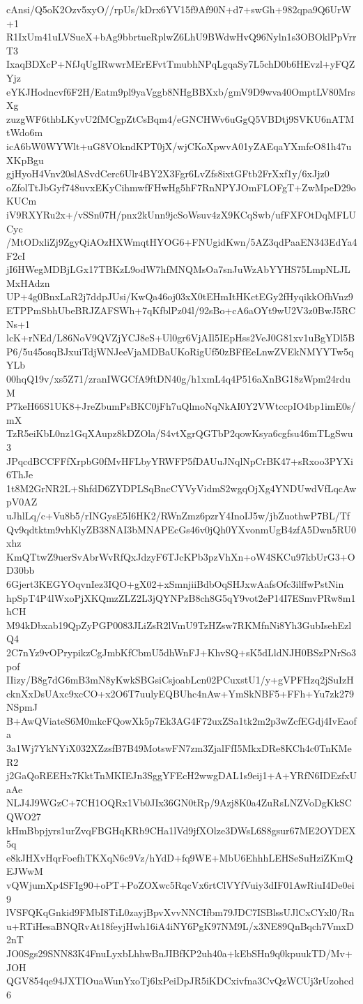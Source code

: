 cAnsi/Q5oK2Ozv5xyO//rpUs/kDrx6YV15f9Af90N+d7+swGh+982qpa9Q6UrW+1
R1IxUm41uLVSueX+bAg9bbrtueRplwZ6LhU9BWdwHvQ96Nyln1s3OBOklPpVrrT3
IxaqBDXcP+NfJqUgIRwwrMErEFvtTmubhNPqLgqaSy7L5chD0b6HEvzl+yFQZYjz
eYKJHodncvf6F2H/Eatm9pl9yaVggb8NHgBBXxb/gmV9D9wva40OmptLV80MrsXg
zuzgWF6thbLKyvU2fMCgpZtCsBqm4/eGNCHWv6uGgQ5VBDtj9SVKU6nATMtWdo6m
icA6bW0WYWlt+uG8VOkndKPT0jX/wjCKoXpwvA01yZAEqaYXmfcO81h47uXKpBgu
gjHyoH4Vnv20slASvdCerc6Ulr4BY2X3Fgr6LvZfs8ixtGFtb2FrXxf1y/6xJjz0
oZfolTtJbGyf748uvxEKyCihmwfFHwHg5hF7RnNPYJOmFLOFgT+ZwMpeD29oKUCm
iV9RXYRu2x+/vSSn07H/pnx2kUnn9jcSoWsuv4zX9KCqSwb/ufFXFOtDqMFLUCyc
/MtODxliZj9ZgyQiAOzHXWmqtHYOG6+FNUgidKwn/5AZ3qdPaaEN343EdYa4F2cI
jI6HWegMDBjLGx17TBKzL9odW7hfMNQMsOa7snJuWzAbYYHS75LmpNLJLMxHAdzn
UP+4g0BnxLaR2j7ddpJUsi/KwQa46oj03xX0tEHmItHKctEGy2fHyqikkOfhVnz9
ETPPmSbhUbeBRJZAFSWh+7qKfblPz04l/92sBo+cA6aOYt9wU2V3z0BwJ5RCNs+1
lcK+rNEd/L86NoV9QVZjYCJ8eS+Ul0gr6VjAIl5IEpHss2VeJ0G81xv1uBgYDl5B
P6/5u45osqBJxuiTdjWNJeeVjaMDBaUKoRigUf50zBFfEeLnwZVEkNMYYTw5qYLb
00hqQ19v/xs5Z71/zranIWGCfA9ftDN40g/h1xmL4q4P516aXnBG18zWpm24rduM
P7keH66S1UK8+JreZbumPsBKC0jFh7uQlmoNqNkAI0Y2VWtccpIO4bp1imE0s/mX
TzR5eiKbL0nz1GqXAupz8kDZOla/S4vtXgrQGTbP2qowKsya6cgfsu46mTLgSwu3
JPqcdBCCFFfXrpbG0fMvHFLbyYRWFP5fDAUuJNqlNpCrBK47+sRxoo3PYXi6ThJe
1t8M2GrNR2L+ShfdD6ZYDPLSqBncCYVyVidmS2wgqOjXg4YNDUwdVfLqcAwpV0AZ
uJhlLq/c+Vu8b5/rINGysE5I6HK2/RWnZmz6pzrY4InoIJ5w/jbZuothwP7BL/Tf
Qv9qdtktm9vhKlyZB38NAI3bMNAPEcGs46v0jQh0YXvonmUgB4zfA5Dwn5RU0xhz
KmQTtwZ9uerSvAbrWvRfQxJdzyF6TJcKPb3pzVhXn+oW4SKCu97kbUrG3+OD30bb
6Gjert3KEGYOqvnIez3IQO+gX02+xSmnjiiBdbOqSHJxwAafsOfc3ilffwPstNin
hpSpT4P4lWxoPjXKQmzZLZ2L3jQYNPzB8ch8G5qY9vot2eP14I7ESmvPRw8m1hCH
M94kDbxab19QpZyPGP0083JLiZsR2lVmU9TzHZsw7RKMfnNi8Yh3GubIsehEzlQ4
2C7nYz9vOPrypikzCgJmbKfCbmU5dhWnFJ+KhvSQ+sK5dLldNJH0BSzPNrSo3pof
IIizy/B8g7dG6mB3mN8yKwkSBGsiCsjoabLcn02PCuxstU1/y+gVPFHzq2jSuIzH
cknXxDsUAxc9xcCO+x2O6T7uulyEQBUhc4nAw+YmSkNBF5+FFh+Yu7zk279NSpmJ
B+AwQViateS6M0mkcFQowXk5p7Ek3AG4F72uxZSa1tk2m2p3wZcfEGdj4IvEaofa
3a1Wj7YkNYiX032XZzsfB7B49MotswFN7zm3ZjalFfI5MkxDRe8KCh4c0TnKMeR2
j2GaQoREEHx7KktTnMKIEJn3SggYFEcH2wwgDAL1s9eij1+A+YRfN6IDEzfxUaAe
NLJ4J9WGzC+7CH1OQRx1Vb0JIx36GN0tRp/9Azj8K0a4ZuRsLNZVoDgKkSCQWO27
kHmBbpjyrs1urZvqFBGHqKRb9CHa1lVd9jfXOlze3DWsL6S8gsur67ME2OYDEX5q
e8kJHXvHqrFoefhTKXqN6c9Vz/hYdD+fq9WE+MbU6EhhhLEHSeSuHziZKmQEJWwM
vQWjumXp4SFIg90+oPT+PoZOXwc5RqcVx6rtClVYfVuiy3dIF01AwRiuI4De0ei9
lVSFQKqGnkid9FMbI8TiL0zayjBpvXvvNNCIfbm79JDC7ISBlssUJlCxCYxl0/Rn
u+RTiHesaBNQRvAt18feyjHwh16iA4iNY6PgK97NM9L/x3NE89QnBqch7VmxD2nT
JO0Sgs29SNN83K4FnuLyxbLhhwBnJIBfKP2uh40a+kEbSHn9q0kpuukTD/Mv+JOH
QGV854qe94JXTIOuaWunYxoTj6lxPeiDpJR5iKDCxivfna3CvQzWCUj3rUzohcd6
